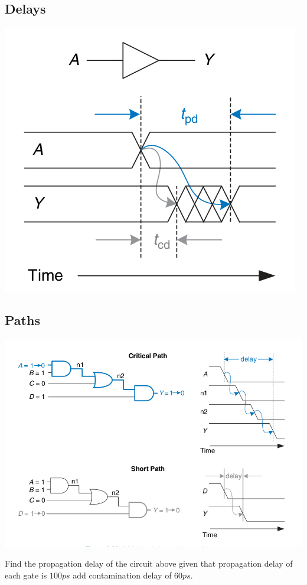 \subsection{Delays}
\includegraphics[width=0.5\linewidth]{fig/fig2.67-delays-tpd-tcd.png}
\begin{definition}
\end{definition}
\vspace{5em}

\begin{definition}
\end{definition}
\vspace{5em}

\subsection{Paths}
\includegraphics[width=0.8\linewidth]{fig/fig2.68-short-path-and-critical-path.png}
\begin{example}
  Find the propagation delay of the circuit above given that propagation delay
  of each gate is $100 ps$  add contamination delay of $60ps$.
\end{example}
\vspace{10em}

